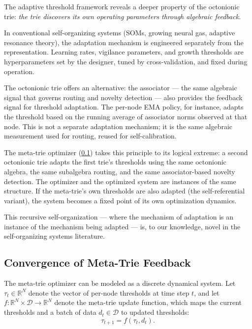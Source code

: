 \documentclass[11pt,a4paper]{article}
\theoremstyle{definition}
\theoremstyle{remark}
\newcommand{\Real}{\mathbb{R}}
\begin{document}
The adaptive threshold framework reveals a deeper property of the octonionic trie: \emph{the trie discovers its own operating parameters through algebraic feedback.}

In conventional self-organizing systems (SOMs, growing neural gas, adaptive resonance theory), the adaptation mechanism is engineered separately from the representation. Learning rates, vigilance parameters, and growth thresholds are hyperparameters set by the designer, tuned by cross-validation, and fixed during operation.

The octonionic trie offers an alternative: the associator --- the same algebraic signal that governs routing and novelty detection --- also provides the feedback signal for threshold adaptation. The per-node EMA policy, for instance, adapts the threshold based on the running average of associator norms observed at that node. This is not a separate adaptation mechanism; it is the same algebraic measurement used for routing, reused for self-calibration.

The meta-trie optimizer (\cref{sec:meta-trie-convergence}) takes this principle to its logical extreme: a second octonionic trie adapts the first trie's thresholds using the same octonionic algebra, the same subalgebra routing, and the same associator-based novelty detection. The optimizer and the optimized system are instances of the same structure. If the meta-trie's own thresholds are also adapted (the self-referential variant), the system becomes a fixed point of its own optimization dynamics.

This recursive self-organization --- where the mechanism of adaptation is an instance of the mechanism being adapted --- is, to our knowledge, novel in the self-organizing systems literature.

\subsection{Convergence of Meta-Trie Feedback}
\label{sec:meta-trie-convergence}

The meta-trie optimizer can be modeled as a discrete dynamical system. Let $\tau_t \in \Real^N$ denote the vector of per-node thresholds at time step $t$, and let $f: \Real^N \times \mathcal{D} \to \Real^N$ denote the meta-trie update function, which maps the current thresholds and a batch of data $d_t \in \mathcal{D}$ to updated thresholds:
\begin{equation}
  \tau_{t+1} = f(\tau_t, d_t).
\end{equation}
\end{document}
